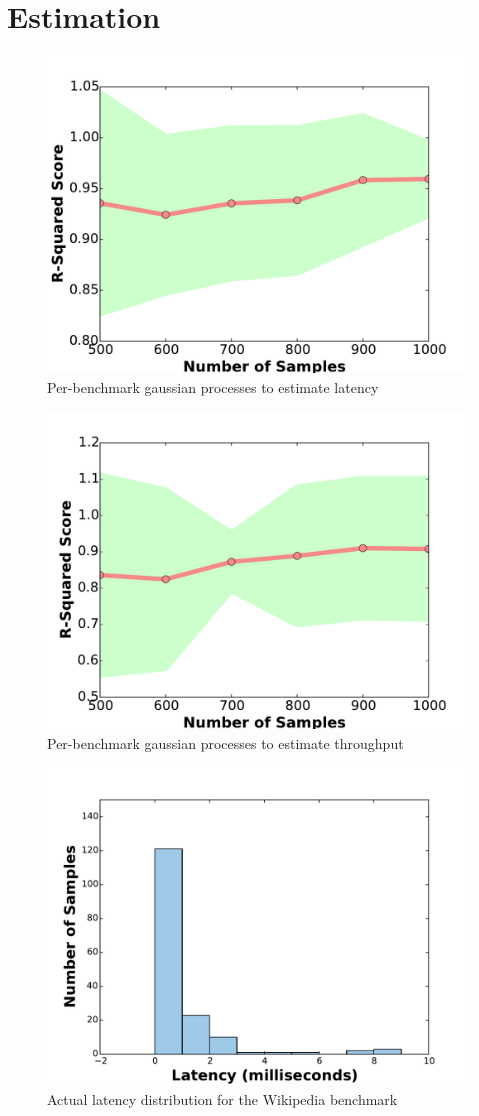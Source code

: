\section{Estimation} \label{sec:estimation}

\begin{figure}[h!]
    \centering
    \includegraphics[width=0.7\linewidth]{figure/gp_per_benchmark_r2_scores_latency_mutate.pdf}
    \caption{Per-benchmark gaussian processes to estimate latency}
    \label{fig:gp_r2_latency}
\end{figure}

\begin{figure}[h!]
    \centering
    \includegraphics[width=0.7\linewidth]{figure/gp_per_benchmark_r2_scores_throughput_mutate.pdf}
    \caption{Per-benchmark gaussian processes to estimate throughput}
    \label{fig:gp_r2_throughput}
\end{figure}

\begin{figure}[h!]
    \centering
    \includegraphics[width=0.7\linewidth]{figure/wikipedia_test_hist_latency_mutate.pdf}
    \caption{Actual latency distribution for the Wikipedia benchmark}
    \label{fig:actual_latency_wikipedia}
\end{figure}

